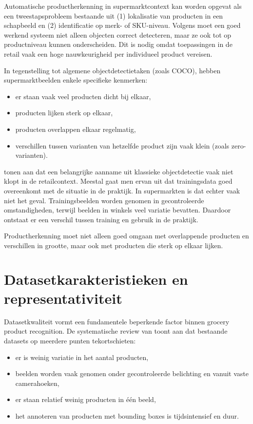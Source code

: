 Automatische productherkenning in supermarktcontext kan worden opgevat als een tweestapsprobleem bestaande uit (1) lokalisatie van producten in een schapbeeld en (2) identificatie op merk- of SKU-niveau. Volgens \textcite{MELEK2024108452} moet een goed werkend systeem niet alleen objecten correct detecteren, maar ze ook tot op productniveau kunnen onderscheiden. Dit is nodig omdat toepassingen in de retail vaak een hoge nauwkeurigheid per individueel product vereisen.

In tegenstelling tot algemene objectdetectietaken (zoals COCO), hebben supermarktbeelden enkele specifieke kenmerken:

\begin{itemize}
\item er staan vaak veel producten dicht bij elkaar,
\item producten lijken sterk op elkaar,
\item producten overlappen elkaar regelmatig,
\item verschillen tussen varianten van hetzelfde product zijn vaak klein (zoals zero-varianten).
\end{itemize}

\textcite{FRANCO2017163} tonen aan dat een belangrijke aanname uit klassieke objectdetectie vaak niet klopt in de retailcontext. Meestal gaat men ervan uit dat trainingsdata goed overeenkomt met de situatie in de praktijk. In supermarkten is dat echter vaak niet het geval. Trainingsbeelden worden genomen in gecontroleerde omstandigheden, terwijl beelden in winkels veel variatie bevatten. Daardoor ontstaat er een verschil tussen training en gebruik in de praktijk.

Productherkenning moet niet alleen goed omgaan met overlappende producten en verschillen in grootte, maar ook met producten die sterk op elkaar lijken.

\section{Datasetkarakteristieken en representativiteit}

Datasetkwaliteit vormt een fundamentele beperkende factor binnen grocery product recognition. De systematische review van \textcite{MELEK2024108452} toont aan dat bestaande datasets op meerdere punten tekortschieten:

\begin{itemize}
\item er is weinig variatie in het aantal producten,
\item beelden worden vaak genomen onder gecontroleerde belichting en vanuit vaste camerahoeken,
\item er staan relatief weinig producten in één beeld,
\item het annoteren van producten met bounding boxes is tijdsintensief en duur.
\end{itemize}

